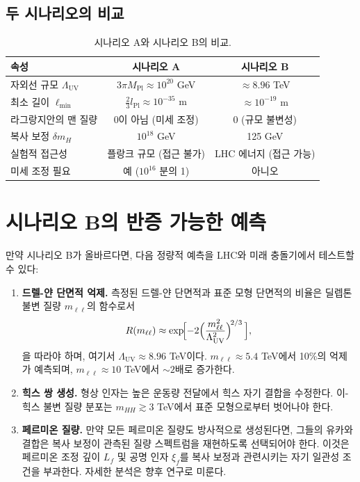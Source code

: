 \documentclass[11pt,a4paper]{article}
\newcommand{\Mpl}{M_{\mathrm{Pl}}}
\newcommand{\Lpl}{l_{\mathrm{Pl}}}
\newcommand{\Lmin}{\ell_{\min}}
\newcommand{\LUV}{\Lambda_{\mathrm{UV}}}
\theoremstyle{remark}
\begin{document}
	\subsection{두 시나리오의 비교}
	
	\begin{table}[H]
		\centering
		\caption{시나리오 A와 시나리오 B의 비교.}
		\label{tab:scenarios}
		\small
		\begin{tabular}{@{}lcc@{}}
			\toprule
			\textbf{속성} & \textbf{시나리오 A} & \textbf{시나리오 B} \\
			\midrule
			자외선 규모 \(\LUV\) & \(3\pi\Mpl \approx 10^{20}\) GeV & \(\approx 8.96\) TeV \\
			최소 길이 \(\Lmin\) & \(\frac{2}{3}\Lpl \approx 10^{-35}\) m & \(\approx 10^{-19}\) m \\
			라그랑지안의 맨 질량 & 0이 아님 (미세 조정) & 0 (규모 불변성) \\
			복사 보정 \(\delta m_H\) & \(10^{18}\) GeV & 125 GeV \\
			실험적 접근성 & 플랑크 규모 (접근 불가) & LHC 에너지 (접근 가능) \\
			미세 조정 필요 & 예 (\(10^{16}\) 분의 1) & 아니오 \\
			\bottomrule
		\end{tabular}
	\end{table}
	
	\section{시나리오 B의 반증 가능한 예측}
	\label{sec:predictions}
	
	만약 시나리오 B가 올바르다면, 다음 정량적 예측을 LHC와 미래 충돌기에서 테스트할 수 있다:
	
	\begin{enumerate}[label=(\arabic*)]
		\item \textbf{드렐-얀 단면적 억제.} 측정된 드렐-얀 단면적과 표준 모형 단면적의 비율은 딜렙톤 불변 질량 \(m_{\ell\ell}\)의 함수로서
		\[
		R(m_{\ell\ell}) \approx \exp\!\Bigl[-2\Bigl(\frac{m_{\ell\ell}^2}{\LUV^2}\Bigr)^{\!2/3}\,\Bigr],
		\]
		을 따라야 하며, 여기서 \(\LUV \approx 8.96\) TeV이다. \(m_{\ell\ell} \approx 5.4\) TeV에서 10\%의 억제가 예측되며, \(m_{\ell\ell} \approx 10\) TeV에서 \(\sim 2\)배로 증가한다.
		
		\item \textbf{힉스 쌍 생성.} 형상 인자는 높은 운동량 전달에서 힉스 자기 결합을 수정한다. 이-힉스 불변 질량 분포는 \(m_{HH} \gtrsim 3\) TeV에서 표준 모형으로부터 벗어나야 한다.
		
		\item \textbf{페르미온 질량.} 만약 모든 페르미온 질량도 방사적으로 생성된다면, 그들의 유카와 결합은 복사 보정이 관측된 질량 스펙트럼을 재현하도록 선택되어야 한다. 이것은 페르미온 조정 깊이 \(L_f\) 및 공명 인자 \(\xi_f\)를 복사 보정과 관련시키는 자기 일관성 조건을 부과한다. 자세한 분석은 향후 연구로 미룬다.
	\end{enumerate}
	
\end{document}
